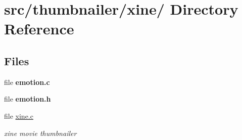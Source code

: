\hypertarget{dir_000017}{
\section{src/thumbnailer/xine/ Directory Reference}
\label{dir_000017}
}
\subsection*{Files}
\begin{CompactItemize}
\item 
file {\bf emotion.c}
\item 
file {\bf emotion.h}
\item 
file \hyperlink{xine_8c}{xine.c}
\begin{CompactList}\small\item\em xine movie thumbnailer \item\end{CompactList}

\end{CompactItemize}
